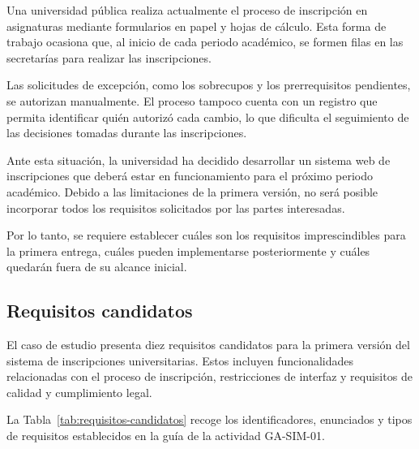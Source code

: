 \documentclass[12pt,a4paper]{article}
\begin{document}
Una universidad pública realiza actualmente el proceso de
inscripción en asignaturas mediante formularios en papel
y hojas de cálculo. Esta forma de trabajo ocasiona que,
al inicio de cada periodo académico, se formen filas en
las secretarías para realizar las inscripciones.

Las solicitudes de excepción, como los sobrecupos y los
prerrequisitos pendientes, se autorizan manualmente.
El proceso tampoco cuenta con un registro que permita
identificar quién autorizó cada cambio, lo que dificulta
el seguimiento de las decisiones tomadas durante las
inscripciones.

Ante esta situación, la universidad ha decidido desarrollar
un sistema web de inscripciones que deberá estar en
funcionamiento para el próximo periodo académico. Debido
a las limitaciones de la primera versión, no será posible
incorporar todos los requisitos solicitados por las partes
interesadas.

Por lo tanto, se requiere establecer cuáles son los
requisitos imprescindibles para la primera entrega, cuáles
pueden implementarse posteriormente y cuáles quedarán
fuera de su alcance inicial.

\subsection{Requisitos candidatos}

El caso de estudio presenta diez requisitos candidatos
para la primera versión del sistema de inscripciones
universitarias. Estos incluyen funcionalidades relacionadas
con el proceso de inscripción, restricciones de interfaz
y requisitos de calidad y cumplimiento legal.

La Tabla~\ref{tab:requisitos-candidatos} recoge los
identificadores, enunciados y tipos de requisitos
establecidos en la guía de la actividad GA-SIM-01.

\begingroup

\small
\singlespacing
\end{document}
